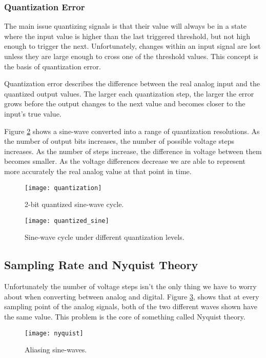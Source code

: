 \documentclass[openany,11pt,fleqn]{book} %
\begin{document}
\subsubsection{Quantization Error}
The main issue quantizing signals is that their value will always be in a state where the input value is higher than the last triggered threshold, but not high enough to trigger the next. Unfortunately, changes within an input signal are lost unless they are large enough to cross one of the threshold values. This concept is the basis of quantization error. 

Quantization error describes the difference between the real analog input and the quantized output values. The larger each quantization step, the larger the error grows before the output changes to the next value and becomes closer to the input's true value. 

Figure \ref{quantized_sine} shows a sine-wave converted into a range of quantization resolutions. As the number of output bits increases, the number of possible voltage steps increases. As the number of steps increase, the difference in voltage between them becomes smaller. As the voltage differences decrease we are able to represent more accurately the real analog value at that point in time.

\begin{figure}[]
    \centering\texttt{[image: quantization]}
    \caption{2-bit quantized sine-wave cycle.}
    \label{quantization}
\end{figure}

\begin{figure}[]
    \centering\texttt{[image: quantized\_sine]}
    \caption{Sine-wave cycle under different quantization levels.}
    \label{quantized_sine}
\end{figure}

\subsection{\color{orange}Sampling Rate and Nyquist Theory}
Unfortunately the number of voltage steps isn't the only thing we have to worry about when converting between analog and digital. Figure \ref{nyquist}, shows that at every sampling point of the analog signals, both of the two different waves shown have the same value. This problem is the core of something called Nyquist theory.

\begin{figure}[]
    \centering\texttt{[image: nyquist]}
    \caption{Aliasing sine-waves.}
    \label{nyquist}
\end{figure}
\end{document}
